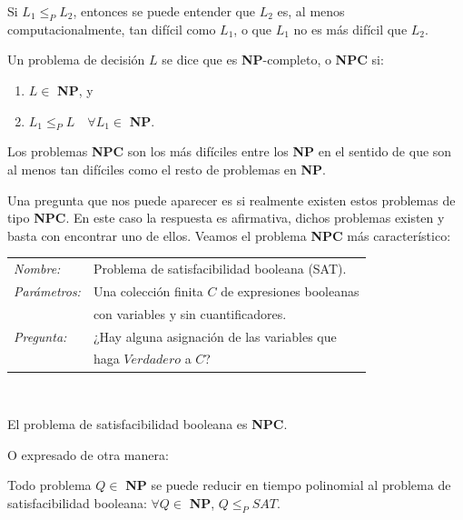 Si $L_1 \leq_P L_2$, entonces se puede entender que $L_2$ es, al menos
computacionalmente, tan difícil como $L_1$, o que $L_1$ no es más difícil que $L_2$.

\begin{definition}
	Un problema de decisión $L$ se dice que es \textbf{NP}-completo, o \textbf{NPC} si:
	\begin{enumerate}[label=(\roman*)]
		\item $L \in $ \textbf{NP}, y
		\item $L_1 \leq_P L \quad \forall L_1 \in $ \textbf{NP}.
	\end{enumerate}
\end{definition}

\hfil

Los problemas \textbf{NPC} son los más difíciles entre los \textbf{NP}
en el sentido de que son al menos tan difíciles como el resto de
problemas en \textbf{NP}.

Una pregunta que nos puede aparecer es si realmente existen estos problemas de
tipo \textbf{NPC}. En este caso la respuesta es afirmativa, dichos problemas
existen y basta con encontrar uno de ellos.
Veamos el problema \textbf{NPC} más característico:

\begin{tabular}{|ll}
	\textit{Nombre:} & Problema de satisfacibilidad booleana (SAT). \\
	\textit{Parámetros:} & Una colección finita $C$ de expresiones booleanas \\
	&  con variables y sin cuantificadores. \\
	\textit{Pregunta:} & ¿Hay alguna asignación de las variables que \\ & haga $Verdadero$ a $C$? \\
\end{tabular}
\\

\begin{theorem}
	El problema de satisfacibilidad booleana es \textbf{NPC}.
\end{theorem}

O expresado de otra manera:

\begin{theorem}
	\label{redNPC:theo}
	Todo problema $Q \in $ \textbf{NP} se puede reducir en tiempo polinomial al problema de satisfacibilidad booleana: $\forall Q \in $ \textbf{NP}, $Q \leq_P SAT$.
\end{theorem}


